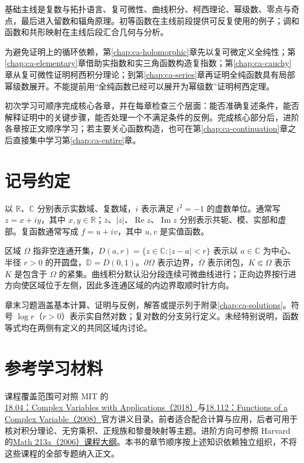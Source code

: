 \documentclass[UTF8,12pt,a4paper,fontset=fandol]{ctexbook}
\begin{document}
基础主线是复数与拓扑语言、复可微性、曲线积分、柯西理论、幂级数、零点与奇点，最后进入留数和辐角原理。初等函数在主线前段提供可反复使用的例子；调和函数和共形映射在主线后段汇合几何与分析。

为避免证明上的循环依赖，第\ref{chap:ca-holomorphic}章先以复可微定义全纯性；第\ref{chap:ca-elementary}章借助实指数和实三角函数构造复指数；第\ref{chap:ca-cauchy}章从复可微性证明柯西积分理论；到第\ref{chap:ca-series}章再证明全纯函数具有局部幂级数展开。不能提前用“全纯函数已经可以展开为幂级数”证明柯西定理。

初次学习可顺序完成核心各章，并在每章检查三个层面：能否准确复述条件，能否解释证明中的关键步骤，能否处理一个不满足条件的反例。完成核心部分后，进阶各章按正文顺序学习；若主要关心函数构造，也可在第\ref{chap:ca-continuation}章之后直接集中学习第\ref{chap:ca-entire}章。

\section{记号约定}

以 $\mathbb{R}$、$\mathbb{C}$ 分别表示实数域、复数域，$i$ 表示满足 $i^2=-1$ 的虚数单位。通常写 $z=x+iy$，其中 $x,y\in\mathbb{R}$；$\overline z$、$|z|$、$\operatorname{Re}z$、$\operatorname{Im}z$ 分别表示共轭、模、实部和虚部。复函数通常写成 $f=u+iv$，其中 $u,v$ 是实值函数。

区域 $\Omega$ 指非空连通开集，$D(a,r)=\{z\in\mathbb{C}:|z-a|<r\}$ 表示以 $a\in\mathbb{C}$ 为中心、半径 $r>0$ 的开圆盘，$\mathbb{D}=D(0,1)$。$\partial\Omega$ 表示边界，$\overline\Omega$ 表示闭包，$K\Subset\Omega$ 表示 $K$ 是包含于 $\Omega$ 的紧集。曲线积分默认沿分段连续可微曲线进行；正向边界按行进方向使区域位于左侧，因此多连通区域的内边界取顺时针方向。

章末习题涵盖基本计算、证明与反例，解答或提示列于附录\ref{chap:ca-solutions}。符号 $\log r$（$r>0$）表示实自然对数；复对数的分支另行定义。未经特别说明，函数等式均在两侧有定义的共同区域内讨论。

\section{参考学习材料}

课程覆盖范围可对照 MIT 的\href{https://ocw.mit.edu/courses/18-04-complex-variables-with-applications-spring-2018/pages/lecture-notes/}{18.04：Complex Variables with Applications（2018）}与\href{https://ocw.mit.edu/courses/18-112-functions-of-a-complex-variable-fall-2008/pages/lecture-notes/}{18.112：Functions of a Complex Variable（2008）}官方讲义目录。前者适合配合计算与应用，后者可用于核对积分理论、无穷乘积、正规族和黎曼映射等主题。进阶方向可参照 Harvard 的\href{https://people.math.harvard.edu/~ctm/home/text/class/harvard/213a/06/html/syl.html}{Math 213a（2006）课程大纲}。本书的章节顺序按上述知识依赖独立组织，不将这些课程的全部专题纳入正文。
\end{document}
